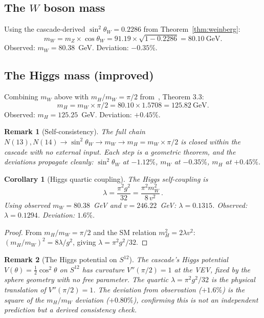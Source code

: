 \documentclass[12pt,a4paper]{article}
\newtheorem{corollary}[theorem]{Corollary}
\newtheorem*{remark}{Remark}
\begin{document}
\subsection{The \texorpdfstring{$W$}{W} boson mass}

Using the cascade-derived $\sin^2\theta_W = 0.2286$ from
Theorem~\ref{thm:weinberg}:
\[
m_W = m_Z \times \cos\theta_W = 91.19 \times \sqrt{1 - 0.2286} = 80.10~\text{GeV}.
\]
Observed: $m_W = 80.38$~GeV. Deviation: $-0.35\%$.

\subsection{The Higgs mass (improved)}

Combining $m_W$ above with $m_H/m_W = \pi/2$ from~\cite{part4a}, Theorem 3.3:
\[
m_H = m_W \times \pi/2 = 80.10 \times 1.5708 = 125.82~\text{GeV}.
\]
Observed: $m_H = 125.25$~GeV. Deviation: $+0.45\%$.

\begin{remark}[Self-consistency]
The full chain $N(13), N(14)\to\sin^2\theta_W \to m_W \to m_H = m_W\times\pi/2$
is closed within the cascade with no external input. Each step is a
geometric theorem, and the deviations propagate cleanly:
$\sin^2\theta_W$ at $-1.12\%$, $m_W$ at $-0.35\%$, $m_H$ at $+0.45\%$.
\end{remark}

\begin{corollary}[Higgs quartic coupling]\label{cor:higgs-quartic}
The Higgs self-coupling is
\[
\lambda = \frac{\pi^2 g^2}{32} = \frac{\pi^2 m_W^2}{8\,v^2}\,.
\]
Using observed $m_W = 80.38$~GeV and $v = 246.22$~GeV: $\lambda = 0.1315$. Observed: $\lambda = 0.1294$. Deviation: $1.6\%$.
\end{corollary}

\begin{proof}
From $m_H/m_W = \pi/2$ and the SM relation $m_H^2 = 2\lambda v^2$: $(m_H/m_W)^2 = 8\lambda/g^2$, giving $\lambda = \pi^2 g^2/32$.
\end{proof}

\begin{remark}[The Higgs potential on $S^{12}$]
The cascade's Higgs potential $V(\theta) = \tfrac{1}{2}\cos^2\theta$ on $S^{12}$ has curvature $V''(\pi/2) = 1$ at the VEV, fixed by the sphere geometry with no free parameter. The quartic $\lambda = \pi^2 g^2/32$ is the physical translation of $V''(\pi/2) = 1$. The deviation from observation ($+1.6\%$) is the square of the $m_H/m_W$ deviation ($+0.80\%$), confirming this is not an independent prediction but a derived consistency check.
\end{remark}
\end{document}
